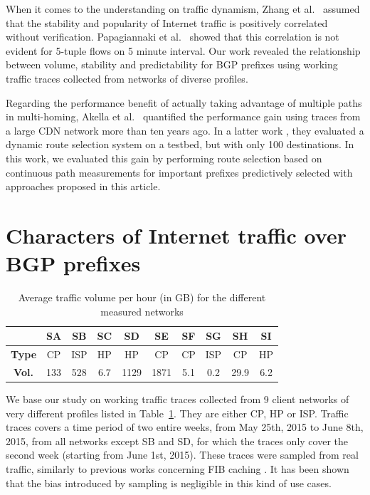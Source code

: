 When it comes to the understanding on traffic dynamism, Zhang et al.\ \cite{Zhang2012} assumed that the stability and popularity of Internet traffic is positively correlated without verification. 
Papagiannaki et al.\ \cite{Papagiannaki2004} showed that this correlation is not evident for 5-tuple flows on 5 minute interval. 
Our work revealed the relationship between volume, stability and predictability for BGP prefixes using working traffic traces collected from networks of diverse profiles.

Regarding the performance benefit of actually taking advantage of multiple paths in multi-homing, Akella et al.\ \cite{Akella2003a} quantified the performance gain using traces from a large CDN network more than ten years ago. 
In a latter work \cite{Akella2008}, they evaluated a dynamic route selection system on a testbed, but with only 100 destinations. 
In this work, we evaluated this gain by performing route selection based on continuous path measurements for important prefixes predictively selected with approaches proposed in this article.

\section{Characters of Internet traffic over BGP prefixes}
\begin{table}[!tb]
\centering
\setlength{\tabcolsep}{0.5em}
\begin{tabular}{cccccccccc}
\toprule
 & \textbf{SA} & \textbf{SB} & \textbf{SC} & \textbf{SD} & \textbf{SE} & \textbf{SF} & \textbf{SG} & \textbf{SH} & \textbf{SI} \\
\midrule
\textbf{Type} & CP & ISP & HP & HP & CP & CP & ISP & CP & HP \\
\textbf{Vol.} & 133 & 528 & 6.7 & 1129 & 1871 & 5.1 & 0.2 & 29.9 & 6.2 \\
\bottomrule
\end{tabular}
\caption{Average traffic volume per hour (in GB) for the different measured networks}
\label{tab:network_type}
\end{table}

We base our study on working traffic traces collected from 9 client networks of very different profiles listed in Table~\ref{tab:network_type}. 
They are either \ac{CP}, \ac{HP} or \ac{ISP}. 
Traffic traces covers a time period of two entire weeks, from May 25th, 2015 to June 8th, 2015, from all networks except SB and SD, for which the traces only cover the second week (starting from June 1st, 2015).
These traces were sampled from real traffic, similarly to previous works concerning FIB caching \cite{Kim2009, Zhang2012}.
It has been shown that the bias introduced by sampling is negligible in this kind of use cases.

